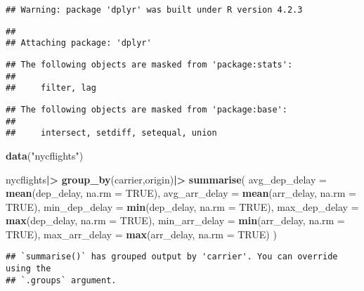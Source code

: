 \documentclass[
]{article}
\newenvironment{Shaded}{\begin{snugshade}}{\end{snugshade}}
\newcommand{\AttributeTok}[1]{\textcolor[rgb]{0.13,0.29,0.53}{#1}}
\newcommand{\ConstantTok}[1]{\textcolor[rgb]{0.56,0.35,0.01}{#1}}
\newcommand{\FunctionTok}[1]{\textcolor[rgb]{0.13,0.29,0.53}{\textbf{#1}}}
\newcommand{\NormalTok}[1]{#1}
\newcommand{\SpecialCharTok}[1]{\textcolor[rgb]{0.81,0.36,0.00}{\textbf{#1}}}
\newcommand{\StringTok}[1]{\textcolor[rgb]{0.31,0.60,0.02}{#1}}
\begin{document}
\begin{verbatim}
## Warning: package 'dplyr' was built under R version 4.2.3
\end{verbatim}

\begin{verbatim}
## 
## Attaching package: 'dplyr'
\end{verbatim}

\begin{verbatim}
## The following objects are masked from 'package:stats':
## 
##     filter, lag
\end{verbatim}

\begin{verbatim}
## The following objects are masked from 'package:base':
## 
##     intersect, setdiff, setequal, union
\end{verbatim}

\begin{Shaded}
\begin{Highlighting}[]
\FunctionTok{data}\NormalTok{(}\StringTok{"nycflights"}\NormalTok{)}

\NormalTok{nycflights}\SpecialCharTok{|\textgreater{}}
  \FunctionTok{group\_by}\NormalTok{(carrier,origin)}\SpecialCharTok{|\textgreater{}}
  \FunctionTok{summarise}\NormalTok{(}
    \AttributeTok{avg\_dep\_delay =} \FunctionTok{mean}\NormalTok{(dep\_delay, }\AttributeTok{na.rm =} \ConstantTok{TRUE}\NormalTok{),}
    \AttributeTok{avg\_arr\_delay =} \FunctionTok{mean}\NormalTok{(arr\_delay, }\AttributeTok{na.rm =} \ConstantTok{TRUE}\NormalTok{),}
    \AttributeTok{min\_dep\_delay =} \FunctionTok{min}\NormalTok{(dep\_delay, }\AttributeTok{na.rm =} \ConstantTok{TRUE}\NormalTok{),}
    \AttributeTok{max\_dep\_delay =} \FunctionTok{max}\NormalTok{(dep\_delay, }\AttributeTok{na.rm =} \ConstantTok{TRUE}\NormalTok{),}
    \AttributeTok{min\_arr\_delay =} \FunctionTok{min}\NormalTok{(arr\_delay, }\AttributeTok{na.rm =} \ConstantTok{TRUE}\NormalTok{),}
    \AttributeTok{max\_arr\_delay =} \FunctionTok{max}\NormalTok{(arr\_delay, }\AttributeTok{na.rm =} \ConstantTok{TRUE}\NormalTok{)}
\NormalTok{  )}
\end{Highlighting}
\end{Shaded}

\begin{verbatim}
## `summarise()` has grouped output by 'carrier'. You can override using the
## `.groups` argument.
\end{verbatim}
\end{document}
